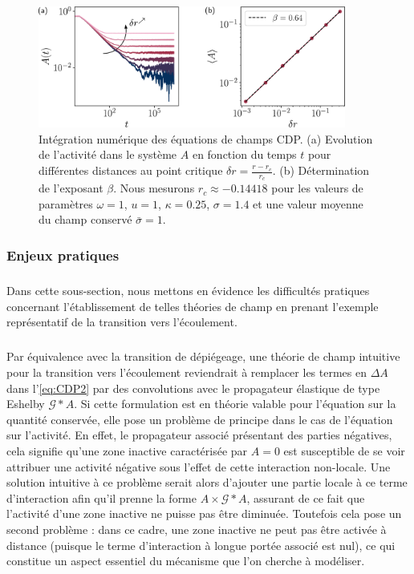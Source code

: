 \begin{figure}[h]
	\centering
	\includegraphics[width=0.9\textwidth]{Chapitre6/Figures/betaCDP_Langevin.pdf}
	\caption{Intégration numérique des équations de champs CDP. (a) Evolution de l'activité dans le système $ A $ en fonction du temps $t$ pour différentes distances au point critique $\delta r = \frac{r-r_c}{r_c}$. (b) Détermination de l'exposant $\beta$. Nous mesurons $r_c \approx -0.14418$ pour les valeurs de paramètres $\omega = 1$, $u = 1$, $\kappa = 0.25$, $\sigma = 1.4$ et une valeur moyenne du champ conservé $\bar{\sigma} = 1$.}
	\label{fig:TestDornicCDP}
\end{figure}

\subsubsection{Enjeux pratiques}

\subparagraph{}Dans cette sous-section, nous mettons en évidence les difficultés pratiques concernant l'établissement de telles théories de champ en prenant l'exemple représentatif de la transition vers l'écoulement.

\subparagraph{}Par équivalence avec la transition de dépiégeage, une théorie de champ intuitive pour la transition vers l'écoulement reviendrait à remplacer les termes en $\Delta A$ dans l'\autoref{eq:CDP2} par des convolutions avec le propagateur élastique de type Eshelby $\mathcal{G}\ast A$. Si cette formulation est en théorie valable pour l'équation sur la quantité conservée, elle pose un problème de principe dans le cas de l'équation sur l'activité. En effet, le propagateur associé présentant des parties négatives, cela signifie qu'une zone inactive caractérisée par $A = 0$ est susceptible de se voir attribuer une activité négative sous l'effet de cette interaction non-locale. Une solution intuitive à ce problème serait alors d'ajouter une partie locale à ce terme d'interaction afin qu'il prenne la forme $A\times \mathcal{G}\ast A$, assurant de ce fait que l'activité d'une zone inactive ne puisse pas être diminuée. Toutefois cela pose un second problème : dans ce cadre, une zone inactive ne peut pas être activée à distance (puisque le terme d'interaction à longue portée associé est nul), ce qui constitue un aspect essentiel du mécanisme que l'on cherche à modéliser.

